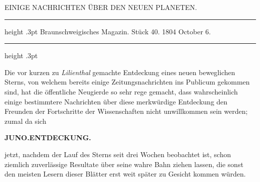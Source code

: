 \par\bigskip
{}
\hypertarget{native-258-lower}{}
\begin{center}
\normalsize EINIGE NACHRICHTEN ÜBER DEN NEUEN PLANETEN.
\end{center}

\begin{center}
\parbox{.74\linewidth}{%
\centering\fontsize{8.2}{10.2}\selectfont
\hrule height .3pt\relax\vspace{2.5pt}
Braunschweigisches Magazin. Stück 40. 1804 October 6.\par
\vspace{2.5pt}\hrule height .3pt\relax
}
\end{center}

\par\indent Die vor kurzen zu \emph{Lilienthal} gemachte Entdeckung eines neuen beweglichen Sterns, von welchem bereits einige Zeitungsnachrichten ins Publicum gekommen sind, hat die öffentliche Neugierde so sehr rege gemacht, dass wahrscheinlich einige bestimmtere Nachrichten über diese merkwürdige Entdeckung den Freunden der Fortschritte der Wissenschaften nicht unwillkommen sein werden; zumal da sich
\par
{}
\clearpage
\thispagestyle{empty}
\noindent{}%
%
\parbox[t]{\dimexpr\linewidth-24mm\relax}{\centering\footnotesize\bfseries JUNO.\quad ENTDECKUNG.\par}%
\makebox[12mm][r]{}\par\nobreak\medskip
\noindent jetzt, nachdem der Lauf des Sterns seit drei Wochen beobachtet ist, schon ziemlich zuverlässige Resultate über seine wahre Bahn ziehen lassen, die sonst den meisten Lesern dieser Blätter erst weit später zu Gesicht kommen würden.

